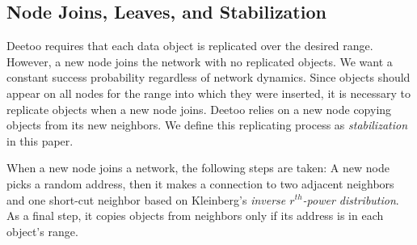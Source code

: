 \documentclass[conference]{IEEEtran}
\begin{document}
\subsection{Node Joins, Leaves, and Stabilization}\label{sec:join}
Deetoo requires that each data object is replicated over the desired 
range.
However, a new node joins the network with no replicated objects. 
We want a constant success probability regardless of network dynamics.
Since objects should appear on all nodes for the range into which they were
inserted, it is necessary to replicate objects when a new node joins.
Deetoo relies on a new node copying objects from its new neighbors. 
We define this replicating process as \emph{stabilization} in this paper.

When a new node joins a network, the following steps are taken:
A new node picks a random address, then it makes a connection to two adjacent
neighbors and one short-cut neighbor based on Kleinberg's
\emph{inverse $r^{th}$-power distribution}. As a final step, 
it copies objects 
from neighbors only if its address is in each object's range.
\end{document}
